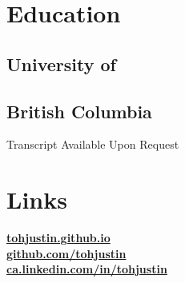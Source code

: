 \documentclass[]{constants}
\begin{document}
%
%
\lastupdated

%
%



%
%

\begin{minipage}[t]{0.30\textwidth} 


\section{Education} 

\subsection{University of }
\subsection{British Columbia }
Transcript Available Upon Request
\sectionsep



\section{Links} 
\href{http://tohjustin.github.io}{\textbf{tohjustin.github.io}}\\
\href{https://github.com/tohjustin}{\textbf{github.com/tohjustin}} \\
\href{https://ca.linkedin.com/in/tohjustin}{\textbf{ca.linkedin.com/in/tohjustin}} \\
\sectionsep


\end{minipage}
\end{document}
